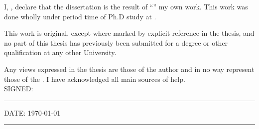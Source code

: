
\begin{declaration}

\noindent I, \href{http://203.64.101.229/ngoctu}{\authorname}, declare that the dissertation is the result of \enquote{\ttitle} my own work. This work was done wholly under period time of Ph.D study at \univname. 

\bigskip

This work is original, except where marked by explicit reference in the thesis, and no part of this thesis has previously been submitted for a degree or other qualification at any other University.

\bigskip

Any views expressed in the thesis are those of the author and in no way represent
those of the \univname. I have acknowledged all main sources of help. \\

\bigskip
\vspace{11mm}
\noindent SIGNED:\\
\rule[0.5em]{25em}{0.5pt} %

\noindent DATE: \today\\
\rule[0.5em]{25em}{0.5pt} %
\end{declaration}

